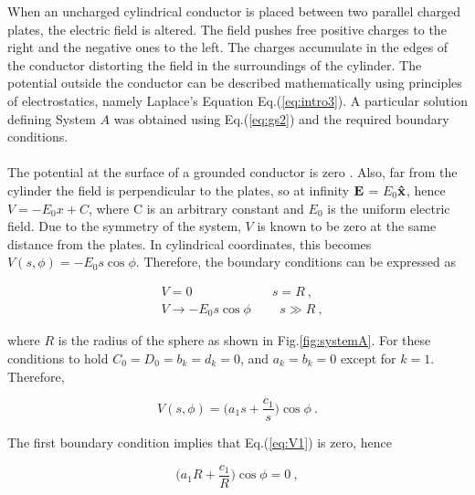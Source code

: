 \documentclass[a4paper]{jpconf}
\begin{document}
When an uncharged cylindrical conductor is placed between two parallel charged plates, the electric field is altered. The field pushes free positive charges to the right and the negative ones to the left. The charges accumulate in the edges of the conductor distorting the field in the surroundings of the cylinder. The potential outside the conductor can be described mathematically using principles of electrostatics, namely Laplace's Equation Eq.(\ref{eq:intro3}). %
A particular solution defining System $A$ was obtained using Eq.(\ref{eq:gs2}) and the required boundary conditions. \\ \\ 


The potential at the surface of a grounded conductor is zero \cite{griffiths-introElec}. Also, far from the cylinder the field is perpendicular to the plates, so at infinity $\bf{E}$ = $E_0$$\bf{\hat{x}}$, hence $V = -E_0 x + C$, where C is an arbitrary constant and $E_0$ is the uniform electric field. Due to the symmetry of the system, $V$ is known to be zero at the same distance from the plates. In cylindrical coordinates, this becomes $V(s,\phi) = -E_0 s \cos{\phi}$. Therefore, the boundary conditions can be expressed as

\begin{subequations}
\begin{align}
&V = 0  \hspace{75pt} s = R~,\\ 
&V \to -E_0 s \cos{\phi} \hspace{27pt} s \gg R~,
\end{align}
\end{subequations}

\noindent where $R$ is the radius of the sphere as shown in Fig.\ref{fig:systemA}. For these conditions to hold $C_0 = D_0 = b_k = d_k=0$, and $a_k = b_k=0$ except for $k=1$. Therefore,

\begin{equation}
V(s,\phi) = \bigg( a_1 s + \frac{c_1}{s}\bigg) \cos{\phi}~.
\label{eq:V1}
\end{equation}

The first boundary condition implies that Eq.(\ref{eq:V1}) is zero, hence

\begin{equation}
\bigg( a_1 R + \frac{c_1}{R}\bigg) \cos{\phi} = 0~,
\end{equation} 
\end{document}
